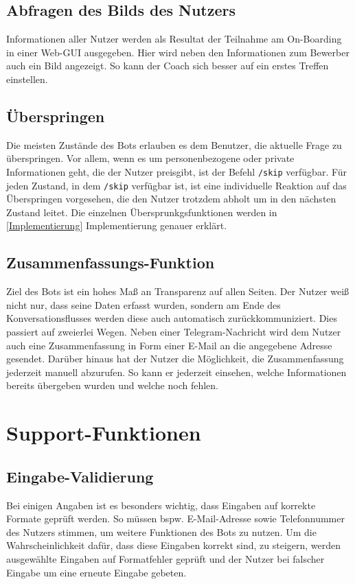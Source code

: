         \subsection{Abfragen des Bilds des Nutzers}
        Informationen aller Nutzer werden als Resultat der Teilnahme am On-Boarding in einer Web-GUI ausgegeben. Hier wird neben den Informationen zum Bewerber auch ein Bild angezeigt. So kann der Coach sich besser auf ein erstes Treffen einstellen. 
        
        \subsection{Überspringen}
            Die meisten Zustände des Bots erlauben es dem Benutzer, die aktuelle Frage zu überspringen. Vor allem, wenn es um personenbezogene oder private Informationen geht, die der Nutzer preisgibt, ist der Befehl \verb|/skip| verfügbar. Für jeden Zustand, in dem \verb|/skip| verfügbar ist, ist eine individuelle Reaktion auf das Überspringen vorgesehen, die den Nutzer trotzdem abholt um in den nächsten Zustand leitet. Die einzelnen Übersprunkgsfunktionen werden in \ref{Implementierung} Implementierung genauer erklärt.
    
        \subsection{Zusammenfassungs-Funktion}
            Ziel des Bots ist ein hohes Maß an Transparenz auf allen Seiten. Der Nutzer weiß nicht nur, dass seine Daten erfasst wurden, sondern am Ende des Konversationsflusses werden diese auch automatisch zurückkommuniziert. Dies passiert auf zweierlei Wegen. Neben einer Telegram-Nachricht wird dem Nutzer auch eine Zusammenfassung in Form einer E-Mail an die angegebene Adresse gesendet. Darüber hinaus hat der Nutzer die Möglichkeit, die Zusammenfassung jederzeit manuell abzurufen. So kann er jederzeit einsehen, welche Informationen bereits übergeben wurden und welche noch fehlen.

            
    \section{Support-Funktionen}
        
        \subsection{Eingabe-Validierung}
        Bei einigen Angaben ist es besonders wichtig, dass Eingaben auf korrekte Formate geprüft werden. So müssen bspw. E-Mail-Adresse sowie Telefonnummer des Nutzers stimmen, um weitere Funktionen des Bots zu nutzen. Um die Wahrscheinlichkeit dafür, dass diese Eingaben korrekt sind, zu steigern, werden ausgewählte Eingaben auf Formatfehler geprüft und der Nutzer bei falscher Eingabe um eine erneute Eingabe gebeten.
        
